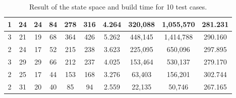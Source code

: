 \begin{table}[H]
\begin{tabular}{|c|c|c|c|c|c|c|c|c|c|}
1                                                 & 24                                        & 24                                          & 84                                              & 278                               & 316                               & 4.264                                   & 320,088                           & 1,055,570                         & 281.231                                 \\ \hline
3                                                 & 21                                        & 19                                          & 68                                              & 364                               & 426                               & 5.262                                   & 448,145                           & 1,414,788                         & 290.160                                 \\ \hline
2                                                 & 24                                        & 17                                          & 52                                              & 215                               & 238                               & 3.623                                   & 225,095                           & 650,096                           & 297.895                                 \\ \hline
3                                                 & 29                                        & 29                                          & 66                                              & 212                               & 237                               & 4.025                                   & 153,464                           & 530,137                           & 279.170                                 \\ \hline
2                                                 & 25                                        & 17                                          & 44                                              & 153                               & 168                               & 3.276                                   & 63,403                            & 156,201                           & 302.744                                 \\ \hline
2                                                 & 31                                        & 20                                          & 40                                              & 85                                & 94                                & 2.559                                   & 22,135                            & 50,746                            & 267.165                                 \\ \hline
\end{tabular}
\caption{Result of the state space and build time for 10 test cases.}
\label{tab:state_space_res}
\end{table}
\egroup

